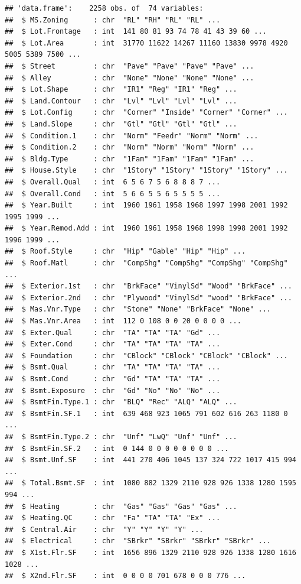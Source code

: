 \documentclass[
]{article}
\begin{document}
\begin{verbatim}
## 'data.frame':    2258 obs. of  74 variables:
##  $ MS.Zoning      : chr  "RL" "RH" "RL" "RL" ...
##  $ Lot.Frontage   : int  141 80 81 93 74 78 41 43 39 60 ...
##  $ Lot.Area       : int  31770 11622 14267 11160 13830 9978 4920 5005 5389 7500 ...
##  $ Street         : chr  "Pave" "Pave" "Pave" "Pave" ...
##  $ Alley          : chr  "None" "None" "None" "None" ...
##  $ Lot.Shape      : chr  "IR1" "Reg" "IR1" "Reg" ...
##  $ Land.Contour   : chr  "Lvl" "Lvl" "Lvl" "Lvl" ...
##  $ Lot.Config     : chr  "Corner" "Inside" "Corner" "Corner" ...
##  $ Land.Slope     : chr  "Gtl" "Gtl" "Gtl" "Gtl" ...
##  $ Condition.1    : chr  "Norm" "Feedr" "Norm" "Norm" ...
##  $ Condition.2    : chr  "Norm" "Norm" "Norm" "Norm" ...
##  $ Bldg.Type      : chr  "1Fam" "1Fam" "1Fam" "1Fam" ...
##  $ House.Style    : chr  "1Story" "1Story" "1Story" "1Story" ...
##  $ Overall.Qual   : int  6 5 6 7 5 6 8 8 8 7 ...
##  $ Overall.Cond   : int  5 6 6 5 5 6 5 5 5 5 ...
##  $ Year.Built     : int  1960 1961 1958 1968 1997 1998 2001 1992 1995 1999 ...
##  $ Year.Remod.Add : int  1960 1961 1958 1968 1998 1998 2001 1992 1996 1999 ...
##  $ Roof.Style     : chr  "Hip" "Gable" "Hip" "Hip" ...
##  $ Roof.Matl      : chr  "CompShg" "CompShg" "CompShg" "CompShg" ...
##  $ Exterior.1st   : chr  "BrkFace" "VinylSd" "Wood" "BrkFace" ...
##  $ Exterior.2nd   : chr  "Plywood" "VinylSd" "wood" "BrkFace" ...
##  $ Mas.Vnr.Type   : chr  "Stone" "None" "BrkFace" "None" ...
##  $ Mas.Vnr.Area   : int  112 0 108 0 0 20 0 0 0 0 ...
##  $ Exter.Qual     : chr  "TA" "TA" "TA" "Gd" ...
##  $ Exter.Cond     : chr  "TA" "TA" "TA" "TA" ...
##  $ Foundation     : chr  "CBlock" "CBlock" "CBlock" "CBlock" ...
##  $ Bsmt.Qual      : chr  "TA" "TA" "TA" "TA" ...
##  $ Bsmt.Cond      : chr  "Gd" "TA" "TA" "TA" ...
##  $ Bsmt.Exposure  : chr  "Gd" "No" "No" "No" ...
##  $ BsmtFin.Type.1 : chr  "BLQ" "Rec" "ALQ" "ALQ" ...
##  $ BsmtFin.SF.1   : int  639 468 923 1065 791 602 616 263 1180 0 ...
##  $ BsmtFin.Type.2 : chr  "Unf" "LwQ" "Unf" "Unf" ...
##  $ BsmtFin.SF.2   : int  0 144 0 0 0 0 0 0 0 0 ...
##  $ Bsmt.Unf.SF    : int  441 270 406 1045 137 324 722 1017 415 994 ...
##  $ Total.Bsmt.SF  : int  1080 882 1329 2110 928 926 1338 1280 1595 994 ...
##  $ Heating        : chr  "Gas" "Gas" "Gas" "Gas" ...
##  $ Heating.QC     : chr  "Fa" "TA" "TA" "Ex" ...
##  $ Central.Air    : chr  "Y" "Y" "Y" "Y" ...
##  $ Electrical     : chr  "SBrkr" "SBrkr" "SBrkr" "SBrkr" ...
##  $ X1st.Flr.SF    : int  1656 896 1329 2110 928 926 1338 1280 1616 1028 ...
##  $ X2nd.Flr.SF    : int  0 0 0 0 701 678 0 0 0 776 ...

\end{verbatim}
\end{document}
